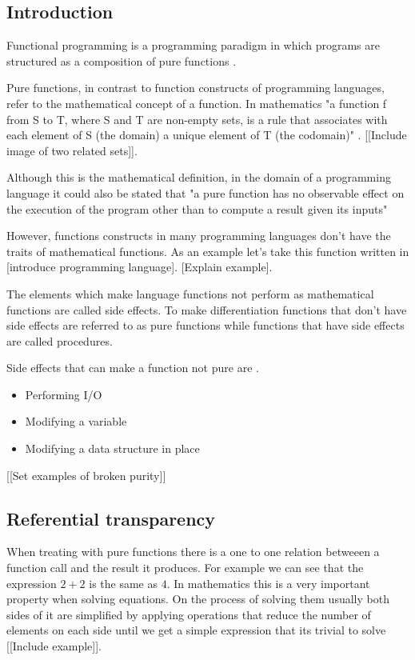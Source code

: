 \documentclass[../main.tex]{subfiles}
\begin{document}
\subsection{Introduction}
Functional programming is a programming paradigm in which programs are structured as a composition of pure functions \autocite{Hughes1989WhyMatters}.

Pure functions, in contrast to function constructs of programming languages, refer to the mathematical concept of a function. In mathematics "a function f from S to T, where S and T are non-empty sets, is a rule that associates with each element of S (the domain) a unique element of T (the codomain)" \autocite{NicholsonTheMathematics}. [[Include image of two related sets]].

Although this is the mathematical definition, in the domain of a programming language it could also be stated that "a pure function has no observable effect on the execution of the program other than to compute a result given its inputs" \autocite{Chiusano2013FunctionalScala}

However, functions constructs in many programming languages don't have the traits of mathematical functions. As an example let's take this function written in [introduce programming language]. [Explain example].

The elements which make language functions not perform as mathematical functions are called side effects. To make differentiation functions that don't have side effects are referred to as pure functions\autocite{UsingAttributes} while functions that have side effects are called procedures.

Side effects that can make a function not pure are \autocite{SpulerCompilerEffects}.

\begin{itemize}
  \item Performing I/O
  \item Modifying a variable
  \item Modifying a data structure in place
\end{itemize}

[[Set examples of broken purity]]

\subsection{Referential transparency}
When treating with pure functions there is a one to one relation betweeen a function call and the result it produces. For example we can see that the expression $2 + 2$ is the same as $4$. In mathematics this is a very important property when solving equations. On the process of solving them usually both sides of it are simplified by applying operations that reduce the number of elements on each side until we get a simple expression that its trivial to solve [[Include example]].
\end{document}
